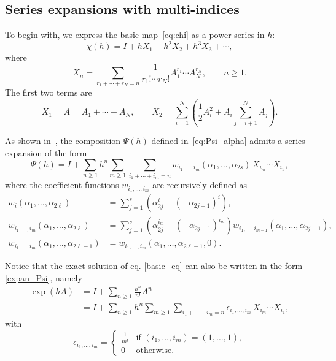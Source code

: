 \documentclass[11pt]{article}
\begin{document}
\subsection{Series expansions with multi-indices}
To begin with, we express the basic map~\eqref{eq:chi} as a power series in $h$:
\[
\chi(h) = I + h X_1 + h^2 X_2 + h^3 X_3 + \cdots,
\]
where
\[
X_n = \sum_{r_1 + \cdots + r_N = n} \frac{1}{r_1! \cdots r_N!} A_1^{r_1} \cdots A_N^{r_N}, \qquad n \ge 1.
\]
The first two terms are
\[
X_1 = A = 
A_1 + \cdots + A_N, \qquad
X_2 = \sum_{i=1}^N \left( \frac{1}{2} A_i^2 + A_i \sum_{j=i+1}^{N} A_j \right).
\]

As shown in~\cite{blanes24smf}, the composition $\Psi(h)$ defined in~\eqref{eq:Psi_alpha} admits a series expansion of the form
\begin{equation} \label{expan_Psi}
 \Psi(h) = I + \sum_{n \ge 1} h^n \sum_{m \ge 1} \sum_{i_1 + \cdots + i_m = n} w_{i_1,\ldots,i_m}(\alpha_1,\ldots,\alpha_{2s}) \,  X_{i_m} \cdots X_{i_1},
\end{equation}
where the coefficient functions $w_{i_1,\ldots,i_m}$ are recursively defined as
\begin{equation}
  \label{eq:wfun}
  \begin{split}
w_{i}(\alpha_1,\ldots,\alpha_{2\ell}) &=
   \sum_{j = 1}^s \left(\alpha_{2j}^{i} - (-\alpha_{2j-1})^{i} \right), \\
w_{i_1,\ldots,i_m}(\alpha_1,\ldots,\alpha_{2\ell}) &=
    \sum_{j = 1}^s \left(\alpha_{2j}^{i_m} - (-\alpha_{2j-1})^{i_m} \right) w_{i_1,\ldots,i_{m-1}}(\alpha_1,\ldots,\alpha_{2j-1}),\\
w_{i_1,\ldots,i_m}(\alpha_1,\ldots,\alpha_{2\ell-1}) &= w_{i_1,\ldots,i_m}(\alpha_1,\ldots,\alpha_{2\ell-1},0).
\end{split}
\end{equation}

Notice that the exact solution of eq. \eqref{basic_eq} can also be written in the form \eqref{expan_Psi}, namely
\begin{equation} \label{exact_sol}
\begin{split}
\exp(h A) &= I + \sum_{n \ge 1} \frac{h^n}{n!} A^n \\
&= I + \sum_{n \ge 1} h^n \sum_{m \ge 1} \sum_{i_1 + \cdots + i_m = n} \epsilon_{i_1,\ldots,i_m} \,  X_{i_m} \cdots X_{i_1},
\end{split}
\end{equation}
with
\begin{equation}
\label{eq:epsilon}
\epsilon_{i_1,\ldots,i_m} =
\begin{cases}
\frac{1}{m!} & \text{if } (i_1,\ldots,i_m) = (1, \ldots, 1), \\
0 & \text{otherwise}.
\end{cases}
\end{equation}
\end{document}
